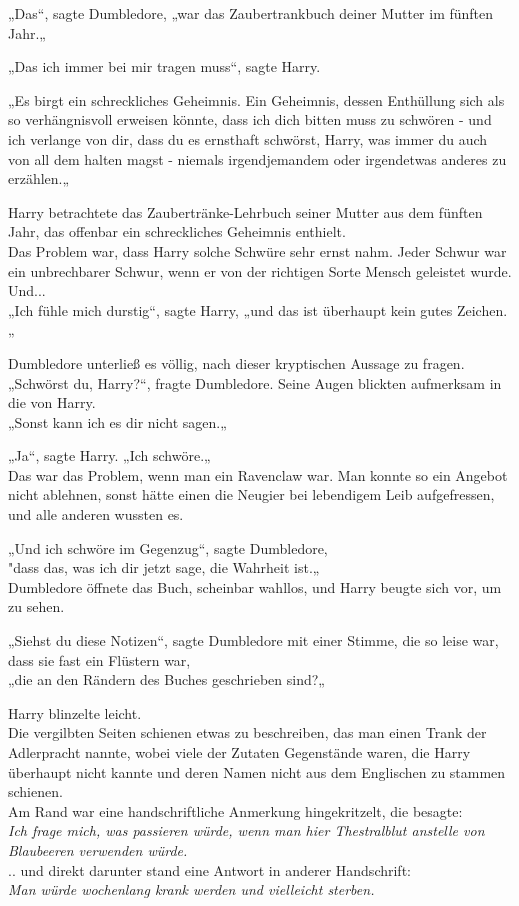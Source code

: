 {„Das“, sagte Dumbledore, „war das Zaubertrankbuch deiner Mutter im fünften Jahr.„

„Das ich immer bei mir tragen muss“, sagte Harry.

„Es birgt ein schreckliches Geheimnis. Ein Geheimnis, dessen Enthüllung sich als so verhängnisvoll erweisen könnte, dass ich dich bitten muss zu schwören - und ich verlange von dir, dass du es ernsthaft schwörst, Harry, was immer du auch von all dem halten magst - niemals irgendjemandem oder irgendetwas anderes zu erzählen.„

Harry betrachtete das Zaubertränke-Lehrbuch seiner Mutter aus dem fünften Jahr, das offenbar ein schreckliches Geheimnis enthielt.\\ Das Problem war, dass Harry solche Schwüre sehr ernst nahm. Jeder Schwur war ein unbrechbarer Schwur, wenn er von der richtigen Sorte Mensch geleistet wurde.\\ Und...\\ „Ich fühle mich durstig“, sagte Harry, „und das ist überhaupt kein gutes Zeichen.„

Dumbledore unterließ es völlig, nach dieser kryptischen Aussage zu fragen.\\ „Schwörst du, Harry?“, fragte Dumbledore. Seine Augen blickten aufmerksam in die von Harry.\\ „Sonst kann ich es dir nicht sagen.„

„Ja“, sagte Harry. „Ich schwöre.„\\ Das war das Problem, wenn man ein Ravenclaw war. Man konnte so ein Angebot nicht ablehnen, sonst hätte einen die Neugier bei lebendigem Leib aufgefressen, und alle anderen wussten es.

„Und ich schwöre im Gegenzug“, sagte Dumbledore,\\ "dass das, was ich dir jetzt sage, die Wahrheit ist.„\\ Dumbledore öffnete das Buch, scheinbar wahllos, und Harry beugte sich vor, um zu sehen.

„Siehst du diese Notizen“, sagte Dumbledore mit einer Stimme, die so leise war, dass sie fast ein Flüstern war,\\ „die an den Rändern des Buches geschrieben sind?„

Harry blinzelte leicht.\\ Die vergilbten Seiten schienen etwas zu beschreiben, das man einen Trank der Adlerpracht nannte, wobei viele der Zutaten Gegenstände waren, die Harry überhaupt nicht kannte und deren Namen nicht aus dem Englischen zu stammen schienen.\\ Am Rand war eine handschriftliche Anmerkung hingekritzelt, die besagte:\\ \emph{Ich frage mich, was passieren würde, wenn man hier Thestralblut anstelle von Blaubeeren verwenden würde.}\\ .. und direkt darunter stand eine Antwort in anderer Handschrift:\\ \emph{Man würde wochenlang krank werden und vielleicht sterben.}

}
